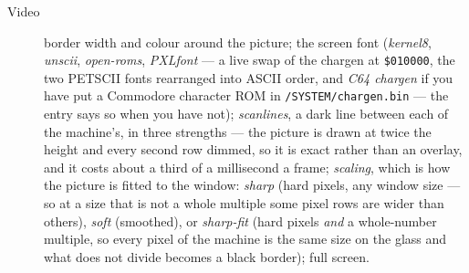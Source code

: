 \begin{description}
\item[Video] border width and colour around the picture; the screen font
  (\emph{kernel8}, \emph{unscii}, \emph{open-roms}, \emph{PXLfont} ---
  a live swap of the chargen at \texttt{\$010000}, the two PETSCII fonts
  rearranged into ASCII order, and \emph{C64 chargen} if you have put a
  Commodore character ROM in \texttt{/SYSTEM/chargen.bin} --- the entry
  says so when you have not); \emph{scanlines}, a dark line between each of
  the machine's, in three strengths --- the picture is drawn at twice the
  height and every second row dimmed, so it is exact rather than an overlay,
  and it costs about a third of a millisecond a frame; \emph{scaling},
  which is how the picture is fitted to the window: \emph{sharp} (hard
  pixels, any window size --- so at a size that is not a whole multiple
  some pixel rows are wider than others), \emph{soft} (smoothed), or
  \emph{sharp-fit} (hard pixels \emph{and} a whole-number multiple, so
  every pixel of the machine is the same size on the glass and what does
  not divide becomes a black border); full screen.


\end{description}
